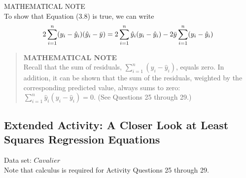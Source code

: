 \documentclass[
]{report}
\theoremstyle{definition}
\theoremstyle{definition}
\theoremstyle{definition}
\theoremstyle{definition}
\theoremstyle{remark}
\begin{document}
MATHEMATICAL NOTE\\
To show that Equation (3.8) is true, we can write
\begin{equation}
2 \sum_{i=1}^n (y_i - \hat{y}_i)(\hat{y}_i - \bar{y})
  = 2 \sum_{i=1}^n \hat{y}_i (y_i - \hat{y}_i)
  - 2 \bar{y} \sum_{i=1}^n (y_i - \hat{y}_i) \notag
\end{equation}

\begin{quote}
\textbf{MATHEMATICAL NOTE}\\
Recall that the sum of residuals, \(\sum_{i=1}^n (y_i - \hat{y}_i)\), equals zero. In addition, it can be shown that the sum of the residuals, weighted by the corresponding predicted value, always sums to zero: \(\sum_{i=1}^n \hat{y}_i (y_i - \hat{y}_i) = 0.\) (See Questions 25 through 29.)
\end{quote}

\hypertarget{extended-activity-a-closer-look-at-least-squares-regression-equations}{%
\subsection*{Extended Activity: A Closer Look at Least Squares Regression Equations}\label{extended-activity-a-closer-look-at-least-squares-regression-equations}}

Data set: \(Cavalier\)\\
Note that calculus is required for Activity Questions 25 through 29.
\end{document}
